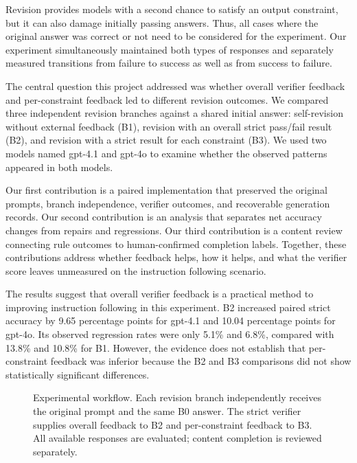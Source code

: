\documentclass[conference]{IEEEtran}
\begin{document}
Revision provides models with a second chance to satisfy an output constraint, but it can also damage initially passing answers. Thus, all cases where the original answer was correct or not need to be considered for the experiment. Our experiment simultaneously maintained both types of responses and separately measured transitions from failure to success as well as from success to failure.

The central question this project addressed was whether overall verifier feedback and per-constraint feedback led to different revision outcomes. We compared three independent revision branches against a shared initial answer: self-revision without external feedback (B1), revision with an overall strict pass/fail result (B2), and revision with a strict result for each constraint (B3). We used two models named gpt-4.1 and gpt-4o to examine whether the observed patterns appeared in both models.

Our first contribution is a paired implementation that preserved the original prompts, branch independence, verifier outcomes, and recoverable generation records. Our second contribution is an analysis that separates net accuracy changes from repairs and regressions. Our third contribution is a content review connecting rule outcomes to human-confirmed completion labels. Together, these contributions address whether feedback helps, how it helps, and what the verifier score leaves unmeasured on the instruction following scenario.

The results suggest that overall verifier feedback is a practical method to improving instruction following in this experiment. B2 increased paired strict accuracy by 9.65 percentage points for gpt-4.1 and 10.04 percentage points for gpt-4o. Its observed regression rates were only 5.1\% and 6.8\%, compared with 13.8\% and 10.8\% for B1. However, the evidence does not establish that per-constraint feedback was inferior because the B2 and B3 comparisons did not show statistically significant differences.

\begin{figure}[!t]
  \centering
  \scalebox{0.88}{}
  \caption{Experimental workflow. Each revision branch independently receives the original prompt and the same B0 answer. The strict verifier supplies overall feedback to B2 and per-constraint feedback to B3. All available responses are evaluated; content completion is reviewed separately.}
  \label{fig:method}
\end{figure}
\end{document}
